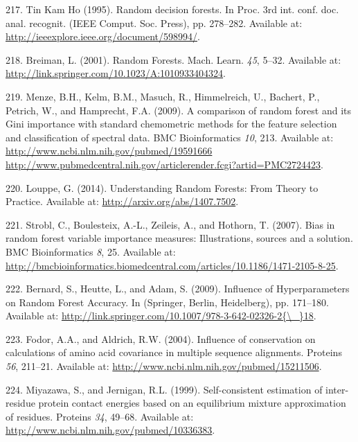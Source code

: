 \documentclass[11pt,a4paper,twoside]{book}
\theoremstyle{definition}
\theoremstyle{definition}
\theoremstyle{remark}
\begin{document}
\hypertarget{ref-TinKamHo}{}
217. Tin Kam Ho (1995). Random decision forests. In Proc. 3rd int. conf.
doc. anal. recognit. (IEEE Comput. Soc. Press), pp. 278--282. Available
at: \url{http://ieeexplore.ieee.org/document/598994/}.

\hypertarget{ref-Breiman2001}{}
218. Breiman, L. (2001). Random Forests. Mach. Learn. \emph{45}, 5--32.
Available at: \url{http://link.springer.com/10.1023/A:1010933404324}.

\hypertarget{ref-Menze2009}{}
219. Menze, B.H., Kelm, B.M., Masuch, R., Himmelreich, U., Bachert, P.,
Petrich, W., and Hamprecht, F.A. (2009). A comparison of random forest
and its Gini importance with standard chemometric methods for the
feature selection and classification of spectral data. BMC
Bioinformatics \emph{10}, 213. Available at:
\href{http://www.ncbi.nlm.nih.gov/pubmed/19591666\%20http://www.pubmedcentral.nih.gov/articlerender.fcgi?artid=PMC2724423}{http://www.ncbi.nlm.nih.gov/pubmed/19591666 http://www.pubmedcentral.nih.gov/articlerender.fcgi?artid=PMC2724423}.

\hypertarget{ref-Louppe2014}{}
220. Louppe, G. (2014). Understanding Random Forests: From Theory to
Practice. Available at: \url{http://arxiv.org/abs/1407.7502}.

\hypertarget{ref-Strobl2007}{}
221. Strobl, C., Boulesteix, A.-L., Zeileis, A., and Hothorn, T. (2007).
Bias in random forest variable importance measures: Illustrations,
sources and a solution. BMC Bioinformatics \emph{8}, 25. Available at:
\url{http://bmcbioinformatics.biomedcentral.com/articles/10.1186/1471-2105-8-25}.

\hypertarget{ref-Bernard2009}{}
222. Bernard, S., Heutte, L., and Adam, S. (2009). Influence of
Hyperparameters on Random Forest Accuracy. In (Springer, Berlin,
Heidelberg), pp. 171--180. Available at:
\href{http://link.springer.com/10.1007/978-3-642-02326-2\%7B/_\%7D18}{http://link.springer.com/10.1007/978-3-642-02326-2\{\textbackslash{}\_\}18}.

\hypertarget{ref-Fodor2004a}{}
223. Fodor, A.A., and Aldrich, R.W. (2004). Influence of conservation on
calculations of amino acid covariance in multiple sequence alignments.
Proteins \emph{56}, 211--21. Available at:
\url{http://www.ncbi.nlm.nih.gov/pubmed/15211506}.

\hypertarget{ref-Miyazawa1999a}{}
224. Miyazawa, S., and Jernigan, R.L. (1999). Self-consistent estimation
of inter-residue protein contact energies based on an equilibrium
mixture approximation of residues. Proteins \emph{34}, 49--68. Available
at: \url{http://www.ncbi.nlm.nih.gov/pubmed/10336383}.
\end{document}
